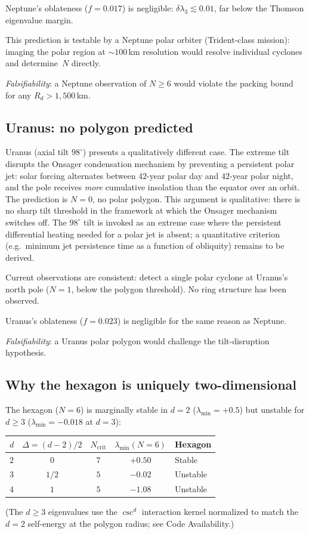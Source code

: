 Neptune's oblateness ($f = 0.017$) is negligible:
$\delta\lambda_3 \lesssim 0.01$, far below the
Thomson eigenvalue margin.

This prediction is testable by a Neptune polar orbiter
(Trident-class mission): imaging the polar region at
$\sim 100$\,km resolution would resolve individual
cyclones and determine~$N$ directly.

\emph{Falsifiability}: a Neptune observation of $N \ge 6$
would violate the packing bound for any
$R_d > 1{,}500$\,km.

\subsection{Uranus: no polygon predicted}
\label{sec:uranus}

Uranus (axial tilt $98^\circ$) presents a qualitatively
different case.
The extreme tilt disrupts the Onsager condensation
mechanism by preventing a persistent polar jet:
solar forcing alternates between $42$-year polar day and
$42$-year polar night, and the pole receives
\emph{more} cumulative insolation than the equator
over an orbit.
The prediction is $N = 0$, no polar polygon.
This argument is qualitative: there is no sharp
tilt threshold in the framework at which
the Onsager mechanism switches off.
The $98^\circ$ tilt is invoked as an extreme case
where the persistent differential heating needed for
a polar jet is absent; a quantitative criterion
(e.g.\ minimum jet persistence time as a function
of obliquity) remains to be derived.

Current observations are consistent:
\citet{Akins2023} detect a single polar cyclone at
Uranus's north pole ($N = 1$, below the polygon threshold).
No ring structure has been observed.

Uranus's oblateness ($f = 0.023$) is negligible for
the same reason as Neptune.

\emph{Falsifiability}: a Uranus polar polygon would
challenge the tilt-disruption hypothesis.

\subsection{Why the hexagon is uniquely two-dimensional}
\label{sec:uniquely-2d}

The hexagon ($N = 6$) is marginally stable in $d = 2$
($\lambda_{\min} = +0.5$) but unstable for $d \ge 3$
($\lambda_{\min} = -0.018$ at $d = 3$):
\begin{center}
\small
\begin{tabular}{lcccl}
\toprule
$d$ & $\Delta = (d{-}2)/2$ & $N_{\mathrm{crit}}$ &
  $\lambda_{\min}(N{=}6)$ & Hexagon \\
\midrule
$2$ & $0$ & $7$ & $+0.50$ & Stable \\
$3$ & $1/2$ & $5$ & $-0.02$ & Unstable \\
$4$ & $1$ & $5$ & $-1.08$ & Unstable \\
\bottomrule
\end{tabular}
\end{center}
\noindent
(The $d \ge 3$ eigenvalues use the $\csc^d$ interaction
kernel normalized to match the $d = 2$ self-energy
at the polygon radius; see Code Availability.)

